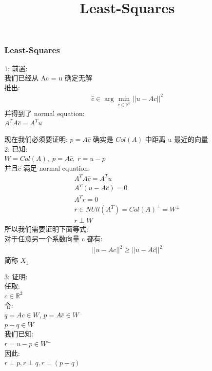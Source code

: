 \documentclass[12pt]{article}
\title{Least-Squares}
\date{}
\begin{document}
\maketitle

\begin{flushleft}
    \subsubsection{Least-Squares}

    1: 前置: \\
    我们已经从 Ac = u 确定无解 \\
    推出:
    \begin{align}
        \hat{c} \in  \arg \min_{c \in \mathbb{R}^{2}} ||u - Ac||^{2}
    \end{align}
    并得到了 normal equation: \\
    $A^{T}A\hat{c} = A^{T}u$

    现在我们必须要证明:
    $p = A\hat{c}$ 确实是 $Col(A)$ 中距离 u 最近的向量 \\


    2: 已知: \\
    $W  = Col(A),\; p = A\hat{c},\; r = u - p$ \\
    并且$\hat{c}$ 满足 normal equation: \\
    \begin{align}
        A^{T}A\hat{c} = A^{T}u                         \\
        A^{T}(u - A\hat{c}) = 0                        \\
        A^{T}r = 0                                     \\
        r \in NUll(A^{T}) = Col(A)^{\perp} = W^{\perp} \\
        r \perp W
    \end{align}
    所以我们需要证明下面等式: \\
    对于任意另一个系数向量 c 都有: \\
    \begin{align}
        ||u - Ac||^{2} \geq ||u - A\hat{c}||^{2}
    \end{align}
    简称 $X_{1}$


    3: 证明: \\
    任取: \\
    $c \in \mathbb{R}^{2}$ \\
    令: \\
    $q = Ac \in W$, $p = A\hat{c} \in W$ \\
    $p - q \in W$ \\
    我们已知: \\
    $r  =  u - p  \in W^{\perp}$ \\
    因此: \\
    $r \perp p, r \perp q, r \perp (p - q)$ \\


\end{flushleft}
\end{document}
